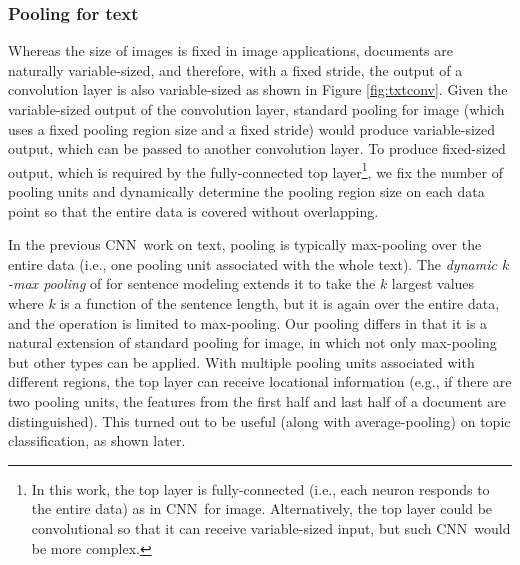 \documentclass[11pt,letterpaper]{article}
\newcommand{\cnn}{CNN}
\begin{document}
\subsubsection{Pooling for text}
Whereas the size of images is fixed in image applications, 
documents are naturally variable-sized, 
and therefore, with a fixed stride, the output of a convolution layer is also variable-sized 
as shown in Figure \ref{fig:txtconv}.  
Given the variable-sized output of the convolution layer, 
standard pooling for image (which uses a fixed pooling region size and a fixed stride) 
would produce variable-sized output, 
which can be passed to another convolution layer.   
To produce fixed-sized output, 
which is required by the fully-connected top layer\footnote{
  In this work, the top layer is fully-connected (i.e., each neuron responds to the entire data) 
  as in \cnn\ for image.  
  Alternatively, the top layer could be convolutional so that it can receive variable-sized input, 
  but such \cnn\ would be more complex.   
}, 
we fix the number of pooling units and dynamically
determine the pooling region size on each data point
so that the entire data is covered without overlapping.  

In the previous \cnn\ work on text, pooling is typically max-pooling 
over the entire data (i.e., one pooling unit associated with the whole text).  
The {\em dynamic $k$-max pooling} of \cite{KGB14} for sentence modeling extends it 
to take the $k$ largest values where $k$ is a function of the sentence length, 
but it is again over the entire data, and the operation is limited to max-pooling.  
Our pooling differs in that it is a natural extension of standard pooling for image, 
in which not only max-pooling but other types can be applied.  
With multiple pooling units associated with 
different regions, %
the top layer can receive locational 
information (e.g., if there are two pooling units, 
the features from the first half and last half of a document are distinguished).  
This turned out to be useful (along with average-pooling) 
on topic classification, as shown later.  

\end{document}
